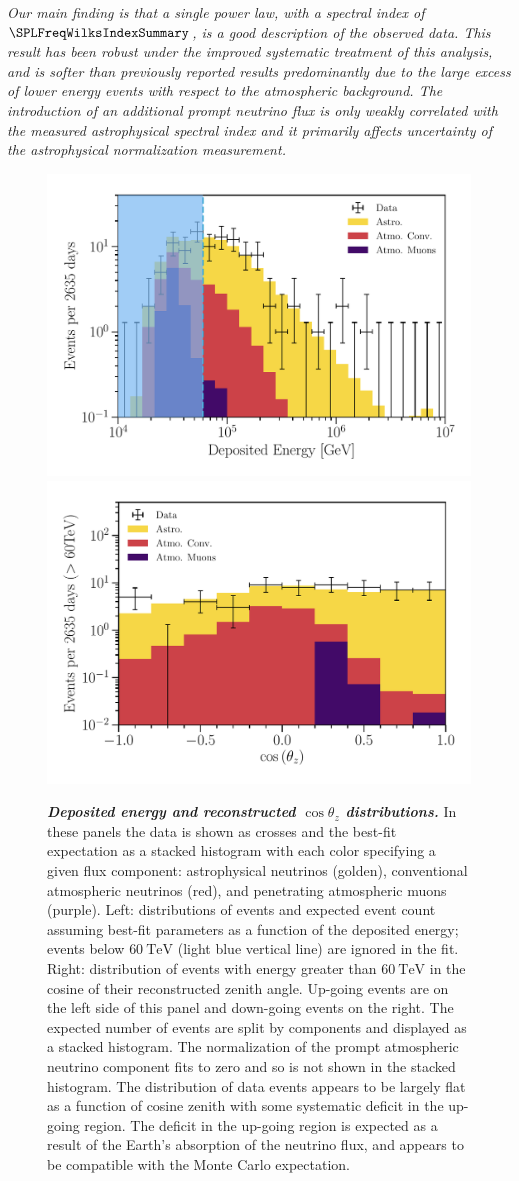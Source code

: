 \noindent
\textit{%
	Our main finding is that a single power law, with a spectral index of $\SPLFreqWilksIndexSummary$, is a good description of the observed data.
	This result has been robust under the improved systematic treatment of this analysis, and is softer than previously reported results predominantly due to the large excess of lower energy events with respect to the atmospheric background.
	The introduction of an additional prompt neutrino flux is only weakly correlated with the measured astrophysical spectral index and it primarily affects uncertainty of the astrophysical normalization measurement.
}
\newline

\begin{figure}
	\centering
	\includegraphics[width=0.45\linewidth]{figures/hese_paper/diffuse_energy_projection_all}
	\includegraphics[width=0.45\linewidth]{figures/hese_paper/diffuse_zenith_projection_all}
	\internallinenumbers
	\caption{\textbf{\textit{Deposited energy and reconstructed $\cos\theta_z$ distributions.}}
		In these panels the data is shown as crosses and the best-fit expectation as a stacked histogram with each color specifying a given flux component: astrophysical neutrinos (golden), conventional atmospheric neutrinos (red), and penetrating atmospheric muons (purple).
		Left: distributions of events and expected event count assuming best-fit parameters as a function of the deposited energy; events below $\SI{60}\TeV$ (light blue vertical line) are ignored in the fit.
		Right: distribution of events with energy greater than $\SI{60}\TeV$ in the cosine of their reconstructed zenith angle.
		Up-going events are on the left side of this panel and down-going events on the right.
		The expected number of events are split by components and displayed as a stacked histogram.
		The normalization of the prompt atmospheric neutrino component fits to zero and so is not shown in the stacked histogram.
		The distribution of data events appears to be largely flat as a function of cosine zenith with some systematic deficit in the up-going region.
		The deficit in the up-going region is expected as a result of the Earth's absorption of the neutrino flux, and appears to be compatible with the Monte Carlo expectation.}\label{fig:energy-zenith}
\end{figure}

